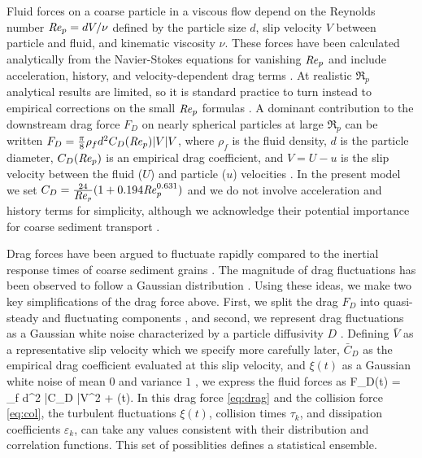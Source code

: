 Fluid forces on a coarse particle in a viscous flow depend on the Reynolds number $\mbox{\textit{Re}}_p = d V/\nu$ defined by the particle size $d$, slip velocity $V$ between particle and fluid, and kinematic viscosity $\nu$.
These forces have been calculated analytically from the Navier-Stokes equations for vanishing $\mbox{\textit{Re}}_p$ and include acceleration, history, and velocity-dependent drag terms \citep{Hjelmfelt1966, Maxey1983, Auton1987}.
At realistic $\Re_p$ analytical results are limited, so it is standard practice to turn instead to empirical corrections on the small $\mbox{\textit{Re}}_p$ formulas \citep{Schmeeckle2007,Mei2006}.
A dominant contribution to the downstream drag force $F_D$ on nearly spherical particles at large $\Re_p$ can be written $F_D = \frac{\pi}{8}
\rho_f d^2 C_D(\mbox{\textit{Re}}_p) |V|V$, where $\rho_f$ is the fluid density, $d$ is the particle diameter, $C_D(\mbox{\textit{Re}}_p)$ is an empirical drag coefficient, and $V = U-u$ is the slip velocity between the fluid ($U$) and particle ($u$) velocities \citep{Coleman1967, Schmeeckle2007, Dwivedi2012}.
In the present model we set $C_D = \frac{24}{\mbox{\textit{Re}}_p}( 1 + 0.194 \mbox{\textit{Re}}_p^{0.631})$ \citep{Clift1978,Gonzalez2017} and we do not involve acceleration and history terms for simplicity, although we acknowledge their potential importance for coarse sediment transport \citep{Michaelides1995,Armenio2001,Dalche2015}.

Drag forces have been argued to fluctuate rapidly compared to the inertial response times of coarse sediment grains \citep{Fan2014}.
The magnitude of drag fluctuations has been observed to follow a Gaussian distribution \citep{Hofland2006,Schmeeckle2007,Dwivedi2010,Celik2014}.
Using these ideas, we make two key simplifications of the drag force above.
First, we split the drag $F_D$ into quasi-steady and fluctuating components \citep{Michaelides1997}, and second, we represent drag fluctuations as a Gaussian white noise characterized by a particle diffusivity $D$ \citep{Fan2014,Ancey2014}. 
Defining $\bar{V}$ as a representative slip velocity which we specify more carefully later,  $\bar{C}_D$ as the empirical drag coefficient evaluated at this slip velocity, and $\xi(t)$ as a Gaussian white noise of mean $0$ and variance $1$ \citep{Gardiner1983}, we express the fluid forces as
\be F_D(t) = 
\rho_f d^2 \bar{C}_D \bar{V}^2 +  \eta(t). \ee
In this drag force \ref{eq:drag} and the collision force \ref{eq:col}, the turbulent fluctuations $\xi(t)$, collision times $\tau_k$, and dissipation coefficients $\varepsilon_k$, can take any values consistent with their distribution and correlation functions. This set of possiblities defines a statistical ensemble.

